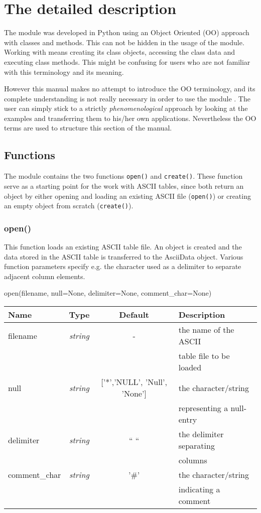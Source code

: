 \section{The detailed description}
\label{details}
The \AAD module was developed in Python using an Object Oriented (OO) approach
with classes and methods. This can not be hidden in the usage of the
\AAD module.
Working with \AAD means creating its class objects, accessing the class data
and executing class methods. This might be confusing for users who are
not familiar with this terminology and its meaning.

However this manual makes no attempt to introduce the OO terminology,
and its complete understanding is not really necessary in order to use
the \AAD module . The user can simply stick to
a strictly {\it phenomenological} approach by looking at the examples
and transferring them to his/her own applications. Nevertheless the OO terms
are used to structure this section of the manual.

%
%
\subsection{Functions}
\label{functions}
The \AAD module contains the two functions {\tt open()} and {\tt create()}.
These function serve as a starting point for the work with ASCII tables,
since both return an \ad object by either opening  and loading
an existing ASCII file ({\tt open()}) or creating an empty \ad object
from scratch ({\tt create()}).

\subsubsection{open()}
\label{functions_open}
This function loads an existing ASCII table file. An \ad object is
created and the data stored in the ASCII table is transferred to the
AsciiData object. Various function parameters specify e.g. the
character used as a delimiter to separate adjacent column elements.

open(filename, null=None, delimiter=None, comment\_char=None)

\begin{tabular}{lccl}
Name     & Type    & Default & Description \\ \hline
filename &{\it string}& - & the name of the ASCII\\
         &            &   & table file to be loaded\\
null     &{\it string}& ['*','NULL', 'Null', 'None']& the character/string\\
         &            &   & representing a null-entry\\
delimiter&{\it string}& `` `` & the delimiter separating\\
         &            &   & columns \\
comment\_char  &{\it string}& '\#' & the character/string\\
         &            &   & indicating a comment\\
\end{tabular}


